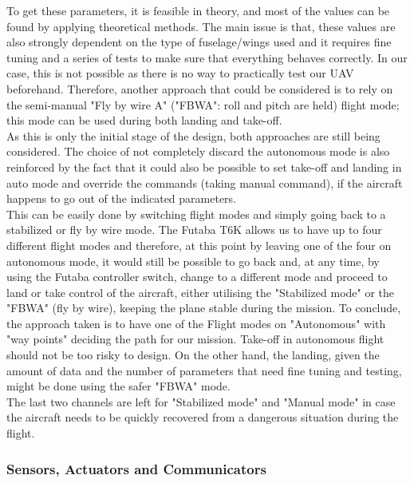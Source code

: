 \documentclass[12pt]{article}
\begin{document}
\noindent To get these parameters, it is feasible in theory, and most of the values can be found by applying theoretical methods. The main issue is that, these values are also strongly dependent on the type of fuselage/wings used and it requires fine tuning and a series of tests to make sure that everything behaves correctly. In our case, this is not possible as there is no way to practically test our UAV beforehand. Therefore, another approach that could be considered is to rely on the semi-manual "Fly by wire A" ("FBWA": roll and pitch are held) flight mode; this mode can be used during both landing and take-off. \\

\noindent As this is only the initial stage of the design, both approaches are still being considered. The choice of not completely discard the autonomous mode is also reinforced by the fact that it could also be possible to set take-off and landing in auto mode and override the commands (taking manual command), if the aircraft happens to go out of the indicated parameters. \\

\noindent This can be easily done by switching flight modes and simply going back to a stabilized or fly by wire mode. The Futaba T6K allows us to have up to four different flight modes and therefore, at this point by leaving one of the four on autonomous mode, it would still be possible to go back and, at any time, by using the Futaba controller switch, change to a different mode and proceed to land or take control of the aircraft, either utilising the "Stabilized mode" or the "FBWA" (fly by wire), keeping the plane stable during the mission. \cite{CONTROL8} To conclude, the approach taken is to have one of the Flight modes on "Autonomous" with "way points" deciding the path for our mission. Take-off in autonomous flight should not be too risky to design. On the other hand, the landing, given the amount of data and the number of parameters that need fine tuning and testing, might be done using the safer "FBWA" mode. \\

\noindent The last two channels are left for "Stabilized mode" and "Manual mode" in case the aircraft needs to be quickly recovered from a dangerous situation during the flight. \\

\subsubsection{Sensors, Actuators and Communicators}
\end{document}
